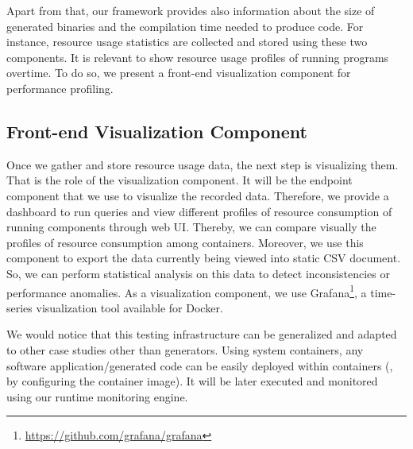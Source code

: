 Apart from that, our framework provides also information about the size of generated binaries and the compilation time needed to produce code.
For instance, resource usage statistics are collected and stored using these two components. It is relevant to show resource usage profiles of running programs overtime. To do so, we present a front-end visualization component for performance profiling. 

\subsection{Front-end Visualization Component}

Once we gather and store resource usage data, the next step is visualizing them. That is the role of the visualization component. It will be the endpoint component that we use to visualize the recorded data. Therefore, we provide a dashboard to run queries and view different profiles of resource consumption of running components through web UI. Thereby, we can compare visually the profiles of resource consumption among containers. Moreover, we use this component to export the data currently being viewed into static CSV document. So, we can perform statistical analysis on this data to detect inconsistencies or performance anomalies.
As a visualization component, we use Grafana\footnote{\url{https://github.com/grafana/grafana}}, a time-series visualization tool available for Docker. 


\begin{remark}
	We would notice that this testing infrastructure can be generalized and adapted to other case studies other than generators. Using system containers, any software application/generated code can be easily deployed within containers (\ie, by configuring the container image). It will be later executed and monitored using our runtime monitoring engine. 
\end{remark}

 	

